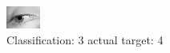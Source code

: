 \begin{figure}[h!]
\begin{center}
\includegraphics[width=0.60\columnwidth]{figures/ID3050_class_3_target_4.png}
\end{center}
\caption{ Classification: 3 actual target: 4}
\label{fig:ID3050_class_3_target_4}
\end{figure}
